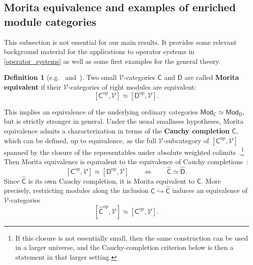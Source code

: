 \documentclass[11pt,onecolumn]{article}
\newcommand{\cV}{\mathscr{V}}
\newcommand{\cC}{\mathsf{C}}
\newcommand{\cD}{\mathsf{D}}
\newcommand{\op}{\mathrm{op}}
\newcommand{\Mod}{\mathsf{Mod}}
\theoremstyle{plain}
\theoremstyle{remark}
\theoremstyle{definition}
\newtheorem{definition}[definition]{Definition}
\begin{document}
\subsection{Morita equivalence and examples of enriched module categories}

This subsection is not essential for our main results.
It provides some relevant background material for the applications to operator systems in \cref{operator_systems} as well as some first examples for the general theory.

\begin{definition}[{e.g.~\cite[\S 5.5]{Kelly} and~\cite{LindnerMorita}}]
	Two small $\cV$-categories $\cC$ and $\cD$ are called \textbf{Morita equivalent} if their $\cV$-categories of right modules are equivalent:
	\[
		[\cC^\op,\cV] \simeq [\cD^\op,\cV].
	\]
\end{definition}

This implies an equivalence of the underlying ordinary categories $\Mod_\cC \simeq \Mod_\cD$, but is strictly stronger in general.
Under the usual smallness hypotheses, Morita equivalence admits a characterization in terms of the \textbf{Cauchy completion} $\widehat{\cC}$,
which can be defined, up to equivalence, as the full $\cV$-subcategory of $[\cC^\op,\cV]$ spanned by the closure of the representables under absolute weighted colimits~\cite[Thm.~2.13 and Cor.~2.14]{StewartCauchyCompletion}.\footnote{If this closure is not essentially small, then the same construction can be used in a larger universe, and the Cauchy-completion criterion below is then a statement in that larger setting.}
Then Morita equivalence is equivalent to the equivalence of Cauchy completions~\cite[Cor.~2.7]{StewartCauchyCompletion}:
\[
	[\cC^\op,\cV] \simeq [\cD^\op,\cV]
	\qquad\Longleftrightarrow\qquad
	\widehat{\cC} \simeq \widehat{\cD}.
\]
Since $\widehat{\cC}$ is its own Cauchy completion, it is Morita equivalent to $\cC$.
More precisely, restricting modules along the inclusion $\cC \hookrightarrow \widehat{\cC}$ induces an equivalence of $\cV$-categories
\[
	[\widehat{\cC}^\op,\cV] \simeq [\cC^\op,\cV].
\]
\end{document}
